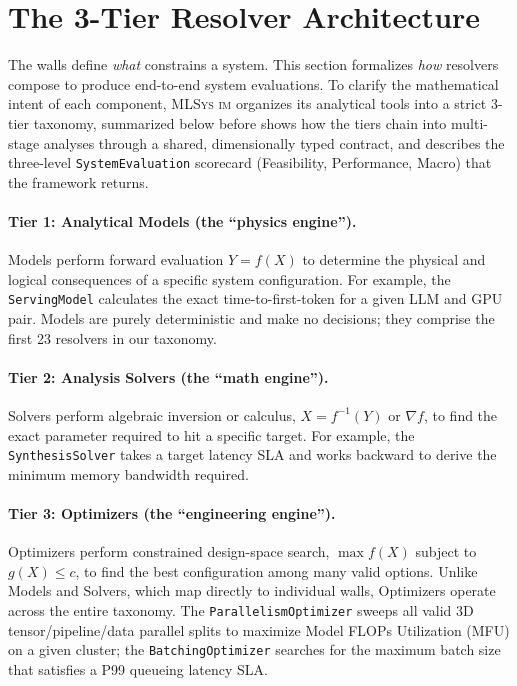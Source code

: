 \documentclass[10pt,twocolumn]{article}
\newcommand{\mlsysim}{\mbox{\textsc{MLSys}\,\textperiodcentered\,\textsc{im}}\xspace}
\begin{document}
\section{The 3-Tier Resolver Architecture}
\label{sec:solver-formalism}

The walls define \emph{what} constrains a system. This section formalizes \emph{how} resolvers compose to produce end-to-end system evaluations. To clarify the mathematical intent of each component, \mlsysim organizes its analytical tools into a strict 3-tier taxonomy, summarized below before  shows how the tiers chain into multi-stage analyses through a shared, dimensionally typed contract, and  describes the three-level \texttt{SystemEvaluation} scorecard (Feasibility, Performance, Macro) that the framework returns.

\paragraph{Tier 1: Analytical Models (the ``physics engine'').} Models perform forward evaluation $Y = f(X)$ to determine the physical and logical consequences of a specific system configuration. For example, the \texttt{ServingModel} calculates the exact time-to-first-token for a given LLM and GPU pair. Models are purely deterministic and make no decisions; they comprise the first 23 resolvers in our taxonomy.

\paragraph{Tier 2: Analysis Solvers (the ``math engine'').} Solvers perform algebraic inversion or calculus, $X = f^{-1}(Y)$ or $\nabla f$, to find the exact parameter required to hit a specific target. For example, the \texttt{SynthesisSolver} takes a target latency SLA and works backward to derive the minimum memory bandwidth required.

\paragraph{Tier 3: Optimizers (the ``engineering engine'').} Optimizers perform constrained design-space search, $\max f(X)$ subject to $g(X) \le c$, to find the best configuration among many valid options. Unlike Models and Solvers, which map directly to individual walls, Optimizers operate across the entire taxonomy. The \texttt{ParallelismOptimizer} sweeps all valid 3D tensor/pipeline/data parallel splits to maximize Model FLOPs Utilization (MFU) on a given cluster; the \texttt{BatchingOptimizer} searches for the maximum batch size that satisfies a P99 queueing latency SLA.
\end{document}
